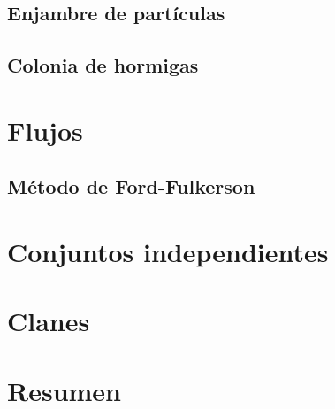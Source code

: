 \subsection{Enjambre de partículas}

\subsection{Colonia de hormigas}

\section{Flujos}

\subsection{Método de Ford-Fulkerson}

\section{Conjuntos independientes}

\section{Clanes}

\section{Resumen}
